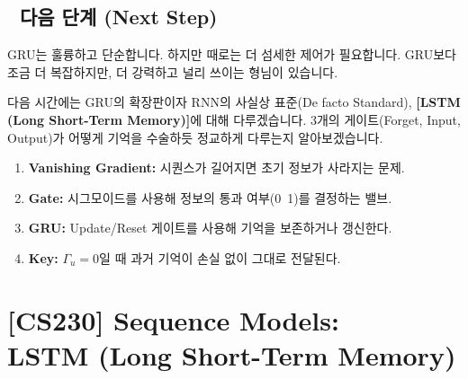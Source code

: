 \documentclass[11pt,a4paper]{book}
\theoremstyle{definition}
\begin{document}
\section*{🔗 다음 단계 (Next Step)}
GRU는 훌륭하고 단순합니다. 하지만 때로는 더 섬세한 제어가 필요합니다. GRU보다 조금 더 복잡하지만, 더 강력하고 널리 쓰이는 형님이 있습니다.

다음 시간에는 GRU의 확장판이자 RNN의 사실상 표준(De facto Standard), \textbf{[LSTM (Long Short-Term Memory)]}에 대해 다루겠습니다. 3개의 게이트(Forget, Input, Output)가 어떻게 기억을 수술하듯 정교하게 다루는지 알아보겠습니다.

\vspace{0.5cm}

\begin{summarybox}[title={단원 요약 (Cheat Sheet)}]
\begin{enumerate}
    \item \textbf{Vanishing Gradient:} 시퀀스가 길어지면 초기 정보가 사라지는 문제.
    \item \textbf{Gate:} 시그모이드를 사용해 정보의 통과 여부(0~1)를 결정하는 밸브.
    \item \textbf{GRU:} Update/Reset 게이트를 사용해 기억을 보존하거나 갱신한다.
    \item \textbf{Key:} $\Gamma_u=0$일 때 과거 기억이 손실 없이 그대로 전달된다.
\end{enumerate}
\end{summarybox}


\chapter{[CS230] Sequence Models: \\ LSTM (Long Short-Term Memory)}
\label{ch:lecture42}

\end{document}
